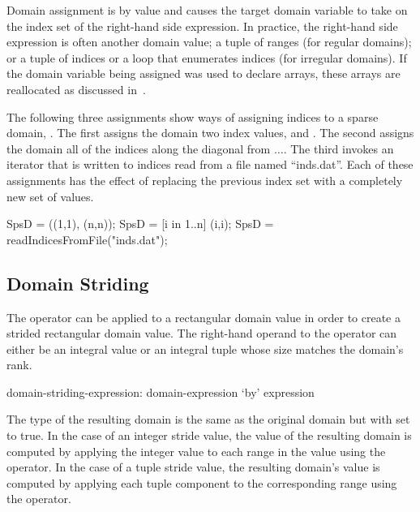 Domain assignment is by
value and causes the target domain variable to take on the index set
of the right-hand side expression.  In practice, the right-hand side
expression is often another domain value; a tuple of ranges (for
regular domains); or a tuple of indices or a loop that enumerates
indices (for irregular domains).  If the domain variable being
assigned was used to declare arrays, these arrays are reallocated as
discussed in~.

\begin{example}
The following three assignments show ways of assigning indices to a
sparse domain, .  The first assigns the domain two index
values,  and .  The second assigns the domain
all of the indices along the diagonal from
$\ldots$.  The third invokes an iterator that
is written to  indices read from a file named
``inds.dat''.  Each of these assignments has the effect of replacing
the previous index set with a completely new set of values.
\begin{chapel}
SpsD = ((1,1), (n,n));
SpsD = [i in 1..n] (i,i);
SpsD = readIndicesFromFile("inds.dat");
\end{chapel}
\end{example}

\subsection{Domain Striding}
\label{Domain_Striding}

The  operator can be applied to a rectangular domain value in
order to create a strided rectangular domain value.  The right-hand
operand to the  operator can either be an integral value or
an integral tuple whose size matches the domain's rank.

\begin{syntax}
domain-striding-expression:
  domain-expression `by' expression
\end{syntax}

The type of the resulting domain is the same as the original domain
but with  set to true.  In the case of an integer
stride value, the value of the resulting domain is computed by
applying the integer value to each range in the value using the
 operator.  In the case of a tuple stride value, the resulting
domain's value is computed by applying each tuple component to the
corresponding range using the  operator.


